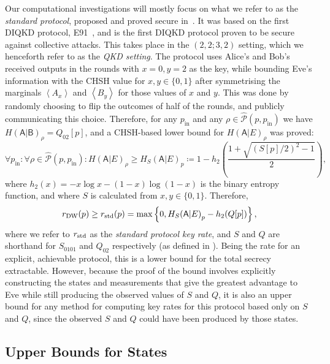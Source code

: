 \documentclass[10pt, a4paper]{article}
\numberwithin{equation}{section} %
\theoremstyle{definition}
\theoremstyle{plain}
\newcommand{\?}{\mathrel{?}} %
\newcommand{\angleb}[1]{\left\langle #1 \right\rangle} %
\newcommand{\crv}[1]{\mathsf{#1}}
\newcommand{\compatstates}[3][]{\hat{\mathcal{P}}#1(#2,#3)}
\newcommand{\prin}[1][p]{#1_{\mathrm{in}}}
\newcommand{\DW}{\rm DW}
\newcommand{\std}{\rm std}
\begin{document}
    Our computational investigations will mostly focus on what we refer to as the \emph{standard protocol}, proposed and proved secure in~\cite{DIQKD_StdProto}. It was based on the first DIQKD protocol, E91~\cite{E91}, and is the first DIQKD protocol proven to be secure against collective attacks. This takes place in the \((2,2;3,2)\) setting, which we henceforth refer to as the \emph{QKD setting}. The protocol uses Alice's and Bob's received outputs in the rounds with \(x = 0, y = 2\) as the key, while bounding Eve's information with the CHSH value for \(x,y \in \{0,1\}\) after symmetrising the marginals \(\angleb{A_x}\) and \(\angleb{B_y}\) for those values of \(x\) and \(y\). This was done by randomly choosing to flip the outcomes of half of the rounds, and publicly communicating this choice. Therefore, for any \(\prin\) and any \(\rho \in \compatstates{p}{\prin}\) we have \({H(\crv{A}|\crv{B})}_{\rho} = Q_{02}[p]\), and a CHSH-based lower bound for \({H(\crv{A}|E)}_{\rho}\) was proved:
    \begin{equation}
      \forall \prin : \forall \rho \in \compatstates{p}{\prin} : {H(\crv{A}|E)}_{\rho} \geq {H_S(\crv{A}|E)}_{p} \coloneqq 1 - h_2\left( \frac{1 + \sqrt{{(S[p]/2)}^2-1}}{2} \right),
    \end{equation}
    where \(h_2(x) = - x \log x - (1-x) \log (1-x)\) is the binary entropy function, and where \(S\) is calculated from \(x,y \in \{0,1\}\). Therefore,
    \begin{equation}
      r_{\DW}(p) \geq r_{\std}(p) = \max \left\{ 0, {H_S(\crv{A}|E)}_{p} - h_2(Q[p]) \right\},
    \end{equation}
    where we refer to \(r_{\std}\) as the \emph{standard protocol key rate}, and \(S\) and \(Q\) are shorthand for \(S_{0101}\) and \(Q_{02}\) respectively (as defined in ). Being the rate for an explicit, achievable protocol, this is a lower bound for the total secrecy extractable. However, because the proof of the bound involves explicitly constructing the states and measurements that give the greatest advantage to Eve while still producing the observed values of \(S\) and \(Q\), it is also an upper bound for any method for computing key rates for this protocol based only on \(S\) and \(Q\), since the observed \(S\) and \(Q\) could have been produced by those states.

    \subsection{Upper Bounds for States}\label{sec:diqkd_ustate}
\end{document}

